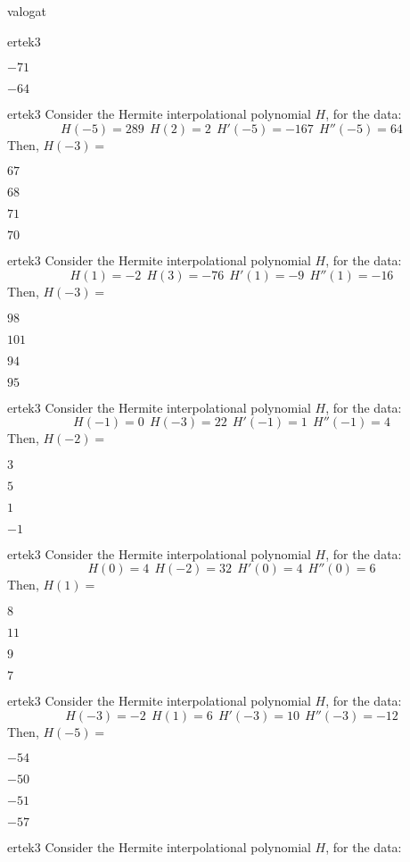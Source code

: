 \documentclass[12pt]{article}
\begin{document}
\begin{quiz}{valogat}
\begin{multi}{ertek3}
\item  $ -71 $
\item  $ -64 $
\end{multi}\begin{multi}{ertek3}
Consider the Hermite interpolational polynomial $H$, for the data:
$$
H(-5)=289 \ \ H(2)=2 \ \ H'(-5)=-167 \ \ H''(-5)=64
$$
Then, $H(-3)=$
\item* $ 67 $
\item  $ 68 $
\item  $ 71 $
\item  $ 70 $
\end{multi}\begin{multi}{ertek3}
Consider the Hermite interpolational polynomial $H$, for the data:
$$
H(1)=-2 \ \ H(3)=-76 \ \ H'(1)=-9 \ \ H''(1)=-16
$$
Then, $H(-3)=$
\item* $ 98 $
\item  $ 101 $
\item  $ 94 $
\item  $ 95 $
\end{multi}\begin{multi}{ertek3}
Consider the Hermite interpolational polynomial $H$, for the data:
$$
H(-1)=0 \ \ H(-3)=22 \ \ H'(-1)=1 \ \ H''(-1)=4
$$
Then, $H(-2)=$
\item* $ 3 $
\item  $ 5 $
\item  $ 1 $
\item  $ -1 $
\end{multi}\begin{multi}{ertek3}
Consider the Hermite interpolational polynomial $H$, for the data:
$$
H(0)=4 \ \ H(-2)=32 \ \ H'(0)=4 \ \ H''(0)=6
$$
Then, $H(1)=$
\item* $ 8 $
\item  $ 11 $
\item  $ 9 $
\item  $ 7 $
\end{multi}\begin{multi}{ertek3}
Consider the Hermite interpolational polynomial $H$, for the data:
$$
H(-3)=-2 \ \ H(1)=6 \ \ H'(-3)=10 \ \ H''(-3)=-12
$$
Then, $H(-5)=$
\item* $ -54 $
\item  $ -50 $
\item  $ -51 $
\item  $ -57 $
\end{multi}\begin{multi}{ertek3}
Consider the Hermite interpolational polynomial $H$, for the data:

\end{multi}
\end{quiz}
\end{document}
